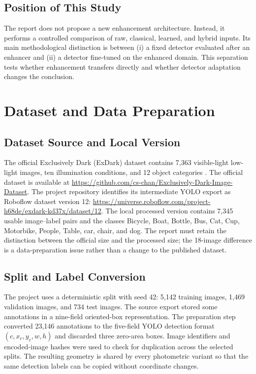 \documentclass[11pt,a4paper]{article}
\begin{document}
\subsection{Position of This Study}

The report does not propose a new enhancement architecture. Instead, it performs
a controlled comparison of raw, classical, learned, and hybrid inputs. Its main
methodological distinction is between (i) a fixed detector evaluated after an
enhancer and (ii) a detector fine-tuned on the enhanced domain. This separation
tests whether enhancement transfers directly and whether detector adaptation
changes the conclusion.

\section{Dataset and Data Preparation}

\subsection{Dataset Source and Local Version}

The official Exclusively Dark (ExDark) dataset contains 7,363 visible-light
low-light images, ten illumination conditions, and 12 object categories
\cite{loh2019exdark}. The official dataset is available at
\url{https://github.com/cs-chan/Exclusively-Dark-Image-Dataset}. The project
repository identifies its intermediate YOLO export as Roboflow dataset version
12: \url{https://universe.roboflow.com/project-h68de/exdark-kd37x/dataset/12}.
The local processed version contains 7,345 usable image--label pairs and the classes
Bicycle, Boat, Bottle, Bus, Cat, Cup, Motorbike, People, Table, car, chair, and
dog. The report must retain the distinction between the official size and the
processed size; the 18-image difference is a data-preparation issue rather than
a change to the published dataset.

\subsection{Split and Label Conversion}

The project uses a deterministic split with seed 42: 5,142 training images,
1,469 validation images, and 734 test images. The source export stored some
annotations in a nine-field oriented-box representation. The preparation step
converted 23,146 annotations to the five-field YOLO detection format
\((c,x_c,y_c,w,h)\) and discarded three zero-area boxes. Image identifiers and
encoded-image hashes were used to check for duplication across the selected
splits. The resulting geometry is shared by every photometric variant so that
the same detection labels can be copied without coordinate changes.
\end{document}
